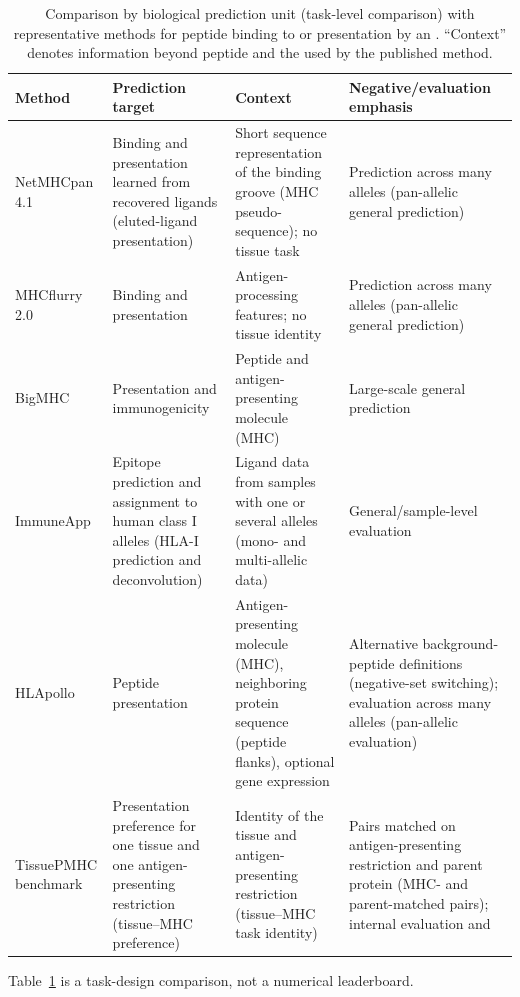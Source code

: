 \begin{table}[tbp]
\centering
\caption{Comparison by biological prediction unit (task-level comparison) with representative methods for peptide binding to or presentation by an \plainMHC{}. ``Context'' denotes information beyond peptide and the \plainMHC{} used by the published method.}
\label{tab:closest-work}
\scriptsize
\setlength{\tabcolsep}{2pt}
\begin{tabular}{@{}>{\raggedright\arraybackslash}p{1.8cm}>{\raggedright\arraybackslash}p{2.5cm}>{\raggedright\arraybackslash}p{2.3cm}>{\raggedright\arraybackslash}p{2.6cm}@{}}
\toprule
Method & Prediction target & Context & Negative/evaluation emphasis \\
\midrule
NetMHCpan 4.1 \cite{reynisson2020netmhcpan} & Binding and presentation learned from recovered ligands (eluted-ligand presentation) & Short sequence representation of the binding groove (MHC pseudo-sequence); no tissue task & Prediction across many alleles (pan-allelic general prediction) \\
MHCflurry 2.0 \cite{odonnell2020mhcflurry} & Binding and presentation & Antigen-processing features; no tissue identity & Prediction across many alleles (pan-allelic general prediction) \\
BigMHC \cite{albert2023bigmhc} & Presentation and immunogenicity & Peptide and antigen-presenting molecule (MHC) & Large-scale general prediction \\
ImmuneApp \cite{xu2024immuneapp} & Epitope prediction and assignment to human class I alleles (HLA-I prediction and deconvolution) & Ligand data from samples with one or several alleles (mono- and multi-allelic data) & General/sample-level evaluation \\
HLApollo \cite{thrift2024hlapollo} & Peptide presentation & Antigen-presenting molecule (MHC), neighboring protein sequence (peptide flanks), optional gene expression & Alternative background-peptide definitions (negative-set switching); evaluation across many alleles (pan-allelic evaluation) \\
TissuePMHC benchmark & Presentation preference for one tissue and one antigen-presenting restriction (tissue--MHC preference) & Identity of the tissue and antigen-presenting restriction (tissue--MHC task identity) & Pairs matched on antigen-presenting restriction and parent protein (MHC- and parent-matched pairs); internal evaluation and \plainPeptideOOF{} \\
\bottomrule
\end{tabular}
\end{table}

Table~\ref{tab:closest-work} is a task-design comparison, not a numerical leaderboard.
